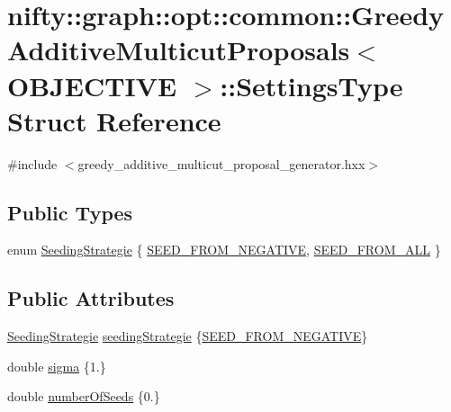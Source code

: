 \hypertarget{structnifty_1_1graph_1_1opt_1_1common_1_1GreedyAdditiveMulticutProposals_1_1SettingsType}{}\section{nifty\+:\+:graph\+:\+:opt\+:\+:common\+:\+:Greedy\+Additive\+Multicut\+Proposals$<$ O\+B\+J\+E\+C\+T\+I\+VE $>$\+:\+:Settings\+Type Struct Reference}
\label{structnifty_1_1graph_1_1opt_1_1common_1_1GreedyAdditiveMulticutProposals_1_1SettingsType}


{\ttfamily \#include $<$greedy\+\_\+additive\+\_\+multicut\+\_\+proposal\+\_\+generator.\+hxx$>$}

\subsection*{Public Types}
\begin{DoxyCompactItemize}
\item 
enum \hyperlink{structnifty_1_1graph_1_1opt_1_1common_1_1GreedyAdditiveMulticutProposals_1_1SettingsType_add8f7ec36c39fc7153f214f187f8d833}{Seeding\+Strategie} \{ \hyperlink{structnifty_1_1graph_1_1opt_1_1common_1_1GreedyAdditiveMulticutProposals_1_1SettingsType_add8f7ec36c39fc7153f214f187f8d833a33375d1f6124902fce1e5d4ca7ecc67f}{S\+E\+E\+D\+\_\+\+F\+R\+O\+M\+\_\+\+N\+E\+G\+A\+T\+I\+VE}, 
\hyperlink{structnifty_1_1graph_1_1opt_1_1common_1_1GreedyAdditiveMulticutProposals_1_1SettingsType_add8f7ec36c39fc7153f214f187f8d833a96d9bade8c350e614c4f17eaf7ee9bfb}{S\+E\+E\+D\+\_\+\+F\+R\+O\+M\+\_\+\+A\+LL}
 \}
\end{DoxyCompactItemize}
\subsection*{Public Attributes}
\begin{DoxyCompactItemize}
\item 
\hyperlink{structnifty_1_1graph_1_1opt_1_1common_1_1GreedyAdditiveMulticutProposals_1_1SettingsType_add8f7ec36c39fc7153f214f187f8d833}{Seeding\+Strategie} \hyperlink{structnifty_1_1graph_1_1opt_1_1common_1_1GreedyAdditiveMulticutProposals_1_1SettingsType_a22d63f9850dd8d3d78d2e46e0621c528}{seeding\+Strategie} \{\hyperlink{structnifty_1_1graph_1_1opt_1_1common_1_1GreedyAdditiveMulticutProposals_1_1SettingsType_add8f7ec36c39fc7153f214f187f8d833a33375d1f6124902fce1e5d4ca7ecc67f}{S\+E\+E\+D\+\_\+\+F\+R\+O\+M\+\_\+\+N\+E\+G\+A\+T\+I\+VE}\}
\item 
double \hyperlink{structnifty_1_1graph_1_1opt_1_1common_1_1GreedyAdditiveMulticutProposals_1_1SettingsType_ab7c03d33c110c2abbd4c1139efd2b285}{sigma} \{1.\}
\item 
double \hyperlink{structnifty_1_1graph_1_1opt_1_1common_1_1GreedyAdditiveMulticutProposals_1_1SettingsType_a9c474a11769e67bdf4e665234326ea94}{number\+Of\+Seeds} \{0.\}
\end{DoxyCompactItemize}


